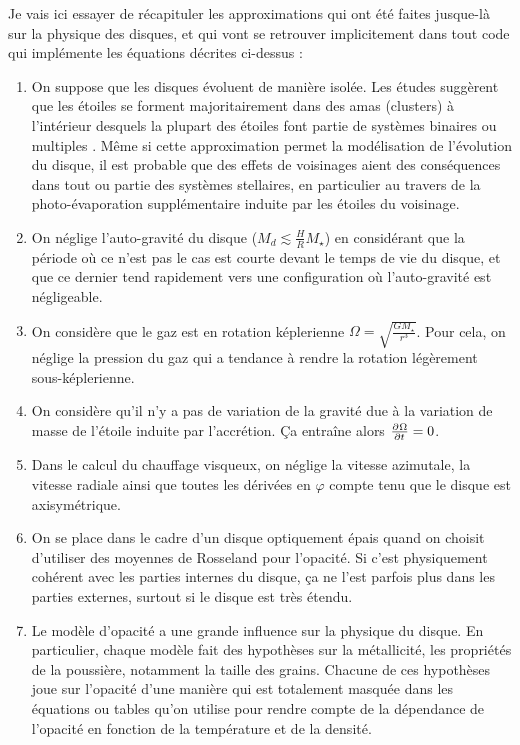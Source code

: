 Je vais ici essayer de récapituler les approximations qui ont été faites jusque-là sur la physique des disques, et qui vont se retrouver implicitement dans tout code qui implémente les équations décrites ci-dessus : 
\begin{enumerate}
\item On suppose que les disques évoluent de manière isolée. Les études suggèrent que les étoiles se forment majoritairement dans des amas (clusters) à l'intérieur desquels la plupart des étoiles font partie de systèmes binaires ou multiples \citep{duquennoy1991multiplicity}. Même si cette approximation permet la modélisation de l'évolution du disque, il est probable que des effets de voisinages aient des conséquences dans tout ou partie des systèmes stellaires, en particulier au travers de la photo-évaporation supplémentaire induite par les étoiles du voisinage.
\item On néglige l'auto-gravité du disque ($M_d \lesssim \frac{H}{R}M_\star$) en considérant que la période où ce n'est pas le cas est courte devant le temps de vie du disque, et que ce dernier tend rapidement vers une configuration où l'auto-gravité est négligeable.
\item On considère que le gaz est en rotation képlerienne $\Omega=\sqrt{\frac{GM_\star}{r^3}}$. Pour cela, on néglige la pression du gaz qui a tendance à rendre la rotation légèrement sous-képlerienne.
\item On considère qu'il n'y a pas de variation de la gravité due à la variation de masse de l'étoile induite par l'accrétion. Ça entraîne alors $\pd{\Omega}{t} = 0$.
\item Dans le calcul du chauffage visqueux, on néglige la vitesse azimutale, la vitesse radiale ainsi que toutes les dérivées en
$\varphi$ compte tenu que le disque est axisymétrique.
\item On se place dans le cadre d'un disque optiquement épais quand on choisit d'utiliser des moyennes de Rosseland pour
l'opacité. Si c'est physiquement cohérent avec les parties internes du disque, ça ne l'est parfois plus dans les parties
externes, surtout si le disque est très étendu.
\item Le modèle d'opacité a une grande influence sur la physique du disque. En particulier, chaque modèle fait des hypothèses sur la métallicité, les propriétés de la poussière, notamment la taille des grains. Chacune de ces hypothèses joue sur l'opacité d'une manière qui est totalement masquée dans les équations ou tables qu'on utilise pour rendre compte de la dépendance de l'opacité en fonction de la température et de la densité.

\end{enumerate}
